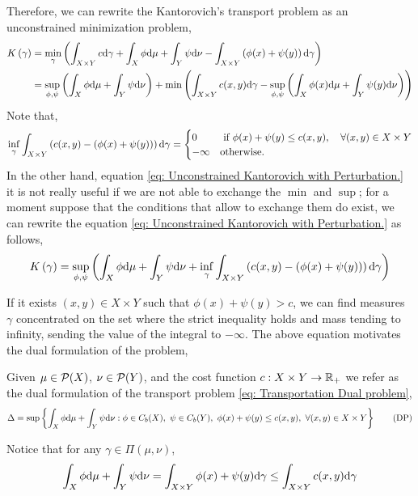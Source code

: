 Therefore, we can rewrite the Kantorovich's transport problem as an unconstrained minimization problem,    
\begin{align}
	K\left(\gamma\right)&=\min_{\gamma}\left( \int_{X\times Y} c\mathrm{d}\gamma +\int_{X} \phi \mathrm{d}\mu +\int_{Y} \psi\mathrm{d}\nu - \int_{X\times Y}\left( \phi(x)+\psi(y) \right)\mathrm{d}\gamma \right) \\
	&=\sup_{\phi,\psi}\left(  \int_{X}\phi\mathrm{d}\mu+\int_{Y}\psi\mathrm{d}\nu \right)+\min\left( \int_{X\times Y}c(x,y)\mathrm{d}\gamma-\sup_{\phi, \psi}\left( \int_{X}\phi(x)\mathrm{d}\mu+\int_{Y}\psi(y)\mathrm{d}\nu \right) \right) \label{eq: Unconstrained Kantorovich with Perturbation.}
\end{align}
Note that,
\begin{equation}
 \inf_{\gamma}\int_{X\times Y}\left( c(x,y)-\left( \phi(x)+\psi(y) \right) \right) \mathrm{d} \gamma =\begin{cases}
	0 & \text{ if } \phi(x)+\psi(y)\leq c(x,y),\quad \forall (x,y)\in X\times Y \\
	-\infty & \text{otherwise}.
 \end{cases}
\end{equation}
In the other hand, equation \eqref{eq: Unconstrained Kantorovich with Perturbation.} it is not really useful if we are not able to exchange the $\min$ and $\sup$; for a moment suppose that the conditions that allow to exchange them do exist, we can rewrite the equation \eqref{eq: Unconstrained Kantorovich with Perturbation.} as follows,
\begin{equation}
	K\left(\gamma\right)=\sup_{\phi, \psi}\left( \int_{X}\phi\mathrm{d}\mu+\int_{Y}\psi\mathrm{d}\nu+\inf_{\gamma}\int_{X\times Y}\left( c(x,y)-\left( \phi(x)+\psi(y) \right) \right)\mathrm{d}\gamma \right)
\end{equation}

If it exists $(x,y) \in X\times Y$ such that $\phi(x)+\psi(y)>c$, we can find measures $\gamma$ concentrated on the set where the strict inequality holds and mass tending to infinity, sending the value of the integral to $-\infty$. The above equation motivates the dual formulation of the problem,

\begin{problem}
Given $\mu\in\mathcal{P}(X)$, $\nu\in\mathcal{P}(Y)$, and the cost function $c:X\times Y\rightarrow \mathbb{R}_+$ we refer as the dual formulation of the transport problem \eqref{eq: Transportation Dual problem},
\begin{equation}
\Delta=\sup\braces{\int_X\phi\dmu+\int_Y\psi \dnu: \phi \in C_b(X),\ \psi \in C_b(Y),\ \phi(x)+\psi(y)\leq c(x,y),\ \forall (x,y)\in X\times Y} \tag{DP} \label{eq: Transportation Dual problem}
\end{equation}	
\end{problem}
Notice that for any $\gamma\in \Pi(\mu, \nu)$,
\begin{equation}
	\int_{X}\phi\mathrm{d}\mu+\int_{Y}\psi\mathrm{d}\nu=\int_{X\times Y} \phi(x)+\psi(y)\mathrm{d} \gamma \leq \int_{X\times Y} c(x,y)\mathrm{d} \gamma
\end{equation}

